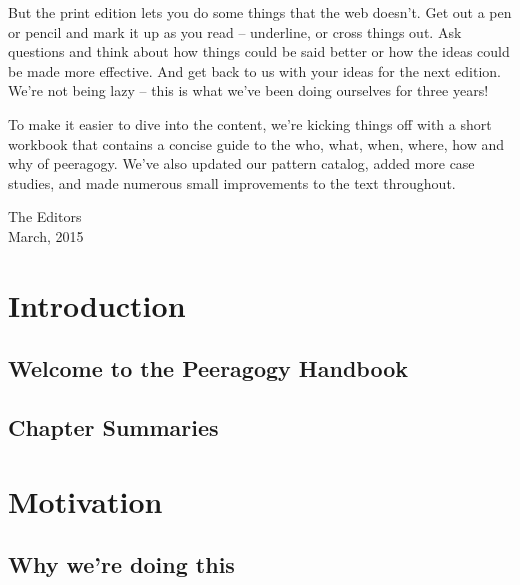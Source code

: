 \documentclass[ebook, 12pt, twoside]{memoir}
\begin{document}
But the print edition lets you do some things that the web doesn't.
Get out a pen or pencil and mark it up as you read -- underline, or
cross things out.  Ask questions and think about how things could be
said better or how the ideas could be made more effective.  And get
back to us with your ideas for the next edition.  We're not being lazy
-- this is what we've been doing ourselves for three years!

To make it easier to dive into the content, we're kicking things off
with a short workbook that contains a concise guide to the who, what,
when, where, how and why of peeragogy.  We've also updated our pattern
catalog, added more case studies, and made numerous small improvements
to the text throughout.

{\flushright The Editors\\March, 2015\\}  
\clearpage

\part{Introduction} \label{intro-part} %
\pagestyle{companion}
\chapter[\textbf{Welcome!}]{Welcome to the Peeragogy Handbook}
%


\newpage



\newpage



\chapter[\textbf{Chapter Summaries}]{Chapter Summaries}
%


\part{Motivation} \label{motivation-part} %
%
\chapter[\textbf{Why we're doing this}]{Why we're doing this}

%
\end{document}
